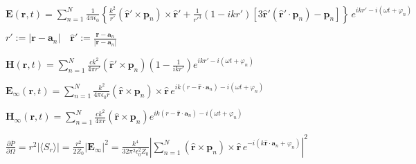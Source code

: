 \documentclass[multi={mymath},border=1pt,convert={density=300,outext=.png}]{standalone}
\newenvironment{mymath}{$\displaystyle}{$}
\begin{document}
\pagecolor[RGB]{255,255,255} %

\newcommand{\norm}[1]{\left|#1\right|}

\begin{mymath}
\mathbf{E}(\mathbf{r}, t) = \sum_{n=1}^{N}\frac{1}{4\pi\epsilon_{0}}\left\{ \frac{k^{2}}{r'}(\mathbf{\hat{r}'} \times \mathbf{p}_{n}) \times \mathbf{\hat{r}'} + \frac{1}{r'^{3}}(1-ikr')\left[3\mathbf{\hat{r}'}(\mathbf{\hat{r}'}\cdot\mathbf{p}_{n}) - \mathbf{p}_{n}\right]\right\}\,e^{ikr' - i(\omega t + \varphi_{n})}
\end{mymath}

\begin{mymath}
r' := |\mathbf{r} - \mathbf{a}_{n}|\quad\mathbf{\hat{r}'} := \frac{\mathbf{r} - \mathbf{a}_{n}}{|\mathbf{r} - \mathbf{a}_{n}|}
\end{mymath}

\begin{mymath}
\mathbf{H}(\mathbf{r}, t) = \sum_{n=1}^{N}\frac{ck^2}{4\pi r'} (\mathbf{\hat{r}'} \times \mathbf{p}_{n}) \left (1 - \frac{1}{ikr'}\right) e^{ikr' - i(\omega t + \varphi_{n})}
\end{mymath}


\begin{mymath}
\mathbf{E}_{\infty}(\mathbf{r}, t) = \sum_{n=1}^{N}\frac{k^{2}}{4\pi\epsilon_{0}r} (\mathbf{\hat{r}} \times \mathbf{p}_{n}) \times \mathbf{\hat{r}}\,e^{ik(r - \mathbf{\hat{r}}\cdot\mathbf{a}_{n}) - i(\omega t + \varphi_{n})}
\end{mymath}

\begin{mymath}
\mathbf{H}_\infty(\mathbf{r}, t) = \sum_{n=1}^{N}\frac{ck^2}{4\pi r} (\mathbf{\hat{r}} \times \mathbf{p}_{n}) e^{ik(r - \mathbf{\hat{r}}\cdot\mathbf{a}_n) - i(\omega t + \varphi_{n})}
\end{mymath}


\begin{mymath}
  \frac{\partial \overline{P}}{\partial \Omega} = r^{2} |\langle S_{r} \rangle| = \frac{r^{2}}{2Z_0} \norm{\mathbf{E}_{\infty}}^{2} = \frac{k^{4}}{32\pi^{2}\epsilon_{0}^{2}Z_0} \norm{\sum_{n=1}^{N} (\mathbf{\hat{r}} \times \mathbf{p}_{n}) \times \mathbf{\hat{r}}\, e^{- i(k\mathbf{\hat{r}}\cdot\mathbf{a}_{n} + \varphi_{n})}}^{2}
\end{mymath}
\end{document}
